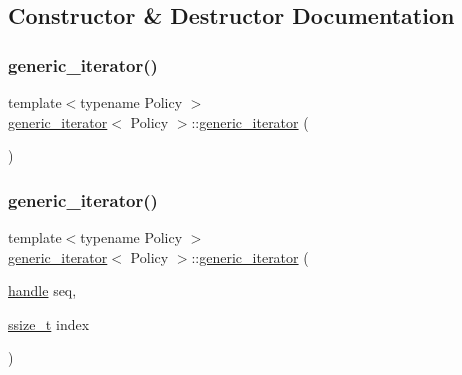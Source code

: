\subsection{Constructor \& Destructor Documentation}
\mbox{\label{classgeneric__iterator_a38559672eba50c4e004eaf58aa45be41}} 
\subsubsection{\texorpdfstring{generic\_iterator()}{generic\_iterator()}\hspace{0.1cm}{\footnotesize\ttfamily [1/2]}}
{\footnotesize\ttfamily template$<$typename Policy $>$ \\
\mbox{\hyperlink{classgeneric__iterator}{generic\+\_\+iterator}}$<$ Policy $>$\+::\mbox{\hyperlink{classgeneric__iterator}{generic\+\_\+iterator}} (\begin{DoxyParamCaption}{ }\end{DoxyParamCaption})\hspace{0.3cm}{\ttfamily [default]}}

\mbox{\label{classgeneric__iterator_a68c753fced7ae65e4469cb2f6932b3a5}} 
\subsubsection{\texorpdfstring{generic\_iterator()}{generic\_iterator()}\hspace{0.1cm}{\footnotesize\ttfamily [2/2]}}
{\footnotesize\ttfamily template$<$typename Policy $>$ \\
\mbox{\hyperlink{classgeneric__iterator}{generic\+\_\+iterator}}$<$ Policy $>$\+::\mbox{\hyperlink{classgeneric__iterator}{generic\+\_\+iterator}} (\begin{DoxyParamCaption}\item[{\mbox{\hyperlink{classhandle}{handle}}}]{seq,  }\item[{\mbox{\hyperlink{detail_2common_8h_ac430d16fc097b3bf0a7469cfd09decda}{ssize\+\_\+t}}}]{index }\end{DoxyParamCaption})\hspace{0.3cm}{\ttfamily [inline]}}



